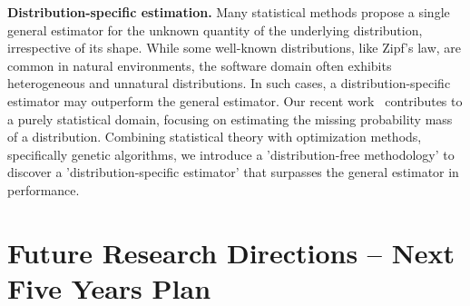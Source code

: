 \documentclass{article}
\begin{document}
\vspace{0.5em}
\noindent\textbf{Distribution-specific estimation.}
Many statistical methods propose a single general estimator for the unknown quantity of the underlying distribution, irrespective of its shape. While some well-known distributions, like Zipf's law, are common in natural environments, the software domain often exhibits heterogeneous and unnatural distributions. In such cases, a distribution-specific estimator may outperform the general estimator. Our recent work~\cite{leeHowMuchUnseen2024} contributes to a purely statistical domain, focusing on estimating the missing probability mass of a distribution. Combining statistical theory with optimization methods, specifically genetic algorithms, we introduce a 'distribution-free methodology' to discover a 'distribution-specific estimator' that surpasses the general estimator in performance.


\section{Future Research Directions -- Next Five Years Plan}



\end{document}
